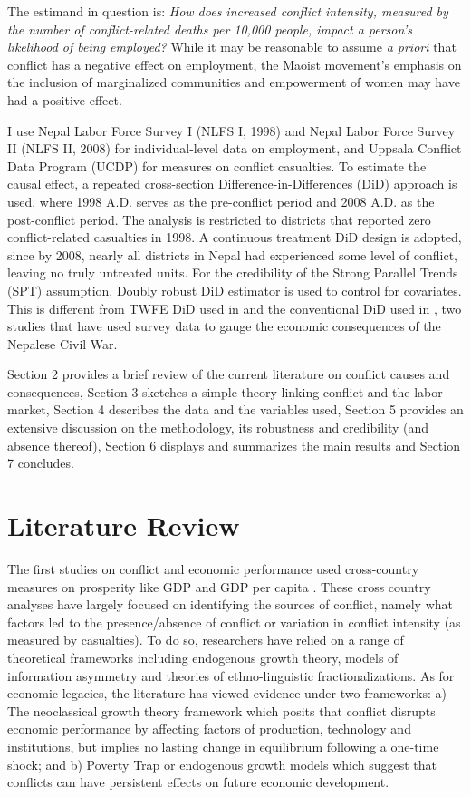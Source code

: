 \documentclass[12pt,a4paper]{article}
\begin{document}
The estimand in question is: \textit{How does increased conflict intensity, measured by the number of conflict-related deaths per 10,000 people, impact a person's likelihood of being employed?} While it may be reasonable to assume \textit{a priori} that conflict has a negative effect on employment, the Maoist movement's emphasis on the inclusion of marginalized communities and empowerment of women may have had a positive effect. 

I use Nepal Labor Force Survey I (NLFS I, 1998) and Nepal Labor Force Survey II (NLFS II, 2008) for individual-level data on employment, and Uppsala Conflict Data Program (UCDP) for measures on conflict casualties. To estimate the causal effect, a repeated cross-section Difference-in-Differences (DiD) approach is used, where 1998 A.D. serves as the pre-conflict period and 2008 A.D. as the post-conflict period. The analysis is restricted to districts that reported zero conflict-related casualties in 1998. A continuous treatment DiD design is adopted, since by 2008, nearly all districts in Nepal had experienced some level of conflict, leaving no truly untreated units. For the credibility of the Strong Parallel Trends (SPT) assumption, Doubly robust DiD estimator is used to control for covariates. This is different from TWFE DiD used in \textcite{menon2015war} and the conventional DiD used in \textcite{valente2014education}, two studies that have used survey data to gauge the economic consequences of the Nepalese Civil War.


Section 2 provides a brief review of the current literature on conflict causes and consequences, Section 3 sketches a simple theory linking conflict and the labor market, Section 4 describes the data and the variables used, Section 5 provides an extensive discussion on the methodology, its robustness and credibility (and absence thereof), Section 6 displays and summarizes the main results and Section 7 concludes. 

\section{Literature Review}


The first studies on conflict and economic performance used cross-country measures on prosperity like GDP and GDP per capita \parencite{blattman2010civil}. These cross country analyses have largely focused on identifying the sources of conflict, namely what factors led to the presence/absence of conflict or  variation in conflict intensity (as measured by casualties). To do so, researchers have relied on a range of theoretical frameworks including endogenous growth theory, models of information asymmetry and theories of ethno-linguistic fractionalizations. As for economic legacies, the literature has viewed evidence under two frameworks: a) The neoclassical growth theory framework which posits that conflict disrupts economic performance by affecting factors of production, technology and institutions, but implies no lasting change in equilibrium following a one-time shock; and b) Poverty Trap or endogenous growth models which suggest that conflicts can have persistent effects on future economic development.
\end{document}
